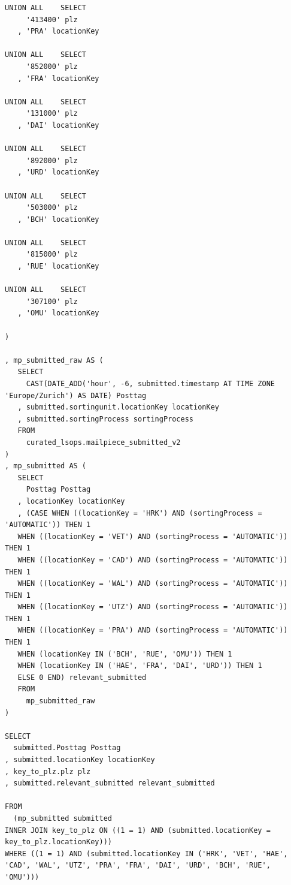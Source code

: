 \begin{lstlisting}[style=sqlstyle]
UNION ALL    SELECT
     '413400' plz
   , 'PRA' locationKey

UNION ALL    SELECT
     '852000' plz
   , 'FRA' locationKey

UNION ALL    SELECT
     '131000' plz
   , 'DAI' locationKey

UNION ALL    SELECT
     '892000' plz
   , 'URD' locationKey

UNION ALL    SELECT
     '503000' plz
   , 'BCH' locationKey

UNION ALL    SELECT
     '815000' plz
   , 'RUE' locationKey

UNION ALL    SELECT
     '307100' plz
   , 'OMU' locationKey

) 

, mp_submitted_raw AS (
   SELECT
     CAST(DATE_ADD('hour', -6, submitted.timestamp AT TIME ZONE 'Europe/Zurich') AS DATE) Posttag
   , submitted.sortingunit.locationKey locationKey
   , submitted.sortingProcess sortingProcess
   FROM
     curated_lsops.mailpiece_submitted_v2
) 
, mp_submitted AS (
   SELECT
     Posttag Posttag
   , locationKey locationKey
   , (CASE WHEN ((locationKey = 'HRK') AND (sortingProcess = 'AUTOMATIC')) THEN 1 
   WHEN ((locationKey = 'VET') AND (sortingProcess = 'AUTOMATIC')) THEN 1 
   WHEN ((locationKey = 'CAD') AND (sortingProcess = 'AUTOMATIC')) THEN 1 
   WHEN ((locationKey = 'WAL') AND (sortingProcess = 'AUTOMATIC')) THEN 1 
   WHEN ((locationKey = 'UTZ') AND (sortingProcess = 'AUTOMATIC')) THEN 1 
   WHEN ((locationKey = 'PRA') AND (sortingProcess = 'AUTOMATIC')) THEN 1 
   WHEN (locationKey IN ('BCH', 'RUE', 'OMU')) THEN 1 
   WHEN (locationKey IN ('HAE', 'FRA', 'DAI', 'URD')) THEN 1 
   ELSE 0 END) relevant_submitted
   FROM
     mp_submitted_raw
) 

SELECT
  submitted.Posttag Posttag
, submitted.locationKey locationKey
, key_to_plz.plz plz
, submitted.relevant_submitted relevant_submitted

FROM
  (mp_submitted submitted
INNER JOIN key_to_plz ON ((1 = 1) AND (submitted.locationKey = key_to_plz.locationKey)))
WHERE ((1 = 1) AND (submitted.locationKey IN ('HRK', 'VET', 'HAE', 'CAD', 'WAL', 'UTZ', 'PRA', 'FRA', 'DAI', 'URD', 'BCH', 'RUE', 'OMU')))

\end{lstlisting}